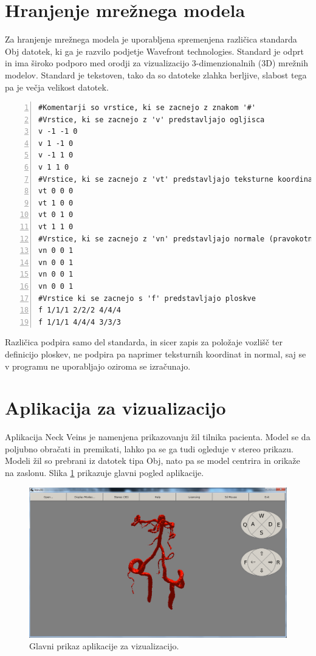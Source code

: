 \documentclass[a4paper, 12pt]{book}
\begin{document}
\section{Hranjenje mrežnega modela}

Za hranjenje mrežnega modela je uporabljena spremenjena različica standarda Obj datotek\cite{obj}, ki ga je razvilo podjetje Wavefront technologies. Standard je odprt in ima široko podporo med orodji za vizualizacijo 3-dimenzionalnih (3D) mrežnih modelov. Standard je tekstoven, tako da so datoteke zlahka berljive, slabost tega pa je večja velikost datotek.
\renewcommand{\lstlistingname}{Datoteka}
\renewcommand{\lstlistlistingname}{Seznam datotek}
\footnotesize{
\begin{lstlisting}[captionpos=b, frame=single, caption={Primer Obj datoteke, ki predstavlja kvadrat.}, breaklines=true, firstline=1, numbers=left]
#Komentarji so vrstice, ki se zacnejo z znakom '#'
#Vrstice, ki se zacnejo z 'v' predstavljajo ogljisca 
v -1 -1 0
v 1 -1 0
v -1 1 0
v 1 1 0
#Vrstice, ki se zacnejo z 'vt' predstavljajo teksturne koordinate
vt 0 0 0
vt 1 0 0
vt 0 1 0
vt 1 1 0
#Vrstice, ki se zacnejo z 'vn' predstavljajo normale (pravokotnice?)
vn 0 0 1
vn 0 0 1
vn 0 0 1
vn 0 0 1
#Vrstice ki se zacnejo s 'f' predstavljajo ploskve
f 1/1/1 2/2/2 4/4/4
f 1/1/1 4/4/4 3/3/3
\end{lstlisting}}

Različica podpira samo del standarda, in sicer zapis za položaje vozlišč ter definicijo ploskev, ne podpira pa naprimer teksturnih koordinat in normal, saj se v programu ne uporabljajo oziroma se izračunajo.

\section{Aplikacija za vizualizacijo}

Aplikacija Neck Veins je namenjena prikazovanju žil tilnika pacienta. Model se da poljubno obračati in premikati, lahko pa se ga tudi ogleduje v stereo prikazu. Modeli žil so prebrani iz datotek tipa Obj, nato pa se model centrira in orikaže na zaslonu. Slika \ref{aplikacija} prikazuje glavni pogled aplikacije.

\begin{figure}
\begin{center}
\includegraphics[width=14cm]{Aplikacija.png}
\end{center}
\caption{Glavni prikaz aplikacije za vizualizacijo.}
\label{aplikacija}
\end{figure}
\end{document}
